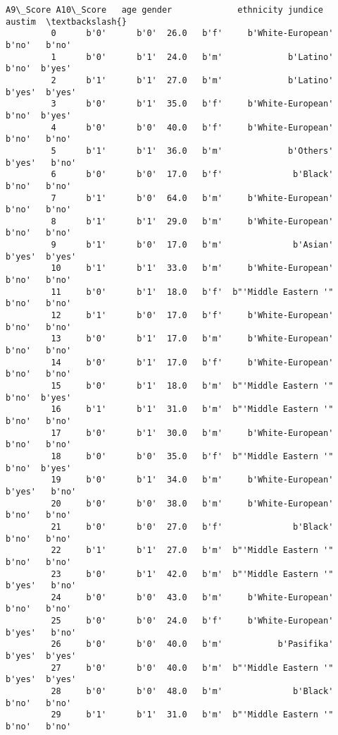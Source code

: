 \documentclass[11pt]{article}
\begin{document}
\begin{Verbatim}[commandchars=\\\{\}]
            A9\_Score A10\_Score   age gender             ethnicity jundice  austim  \textbackslash{}
         0      b'0'      b'0'  26.0   b'f'     b'White-European'   b'no'   b'no'   
         1      b'0'      b'1'  24.0   b'm'             b'Latino'   b'no'  b'yes'   
         2      b'1'      b'1'  27.0   b'm'             b'Latino'  b'yes'  b'yes'   
         3      b'0'      b'1'  35.0   b'f'     b'White-European'   b'no'  b'yes'   
         4      b'0'      b'0'  40.0   b'f'     b'White-European'   b'no'   b'no'   
         5      b'1'      b'1'  36.0   b'm'             b'Others'  b'yes'   b'no'   
         6      b'0'      b'0'  17.0   b'f'              b'Black'   b'no'   b'no'   
         7      b'1'      b'0'  64.0   b'm'     b'White-European'   b'no'   b'no'   
         8      b'1'      b'1'  29.0   b'm'     b'White-European'   b'no'   b'no'   
         9      b'1'      b'0'  17.0   b'm'              b'Asian'  b'yes'  b'yes'   
         10     b'1'      b'1'  33.0   b'm'     b'White-European'   b'no'   b'no'   
         11     b'0'      b'1'  18.0   b'f'  b"'Middle Eastern '"   b'no'   b'no'   
         12     b'1'      b'0'  17.0   b'f'     b'White-European'   b'no'   b'no'   
         13     b'0'      b'1'  17.0   b'm'     b'White-European'   b'no'   b'no'   
         14     b'0'      b'1'  17.0   b'f'     b'White-European'   b'no'   b'no'   
         15     b'0'      b'1'  18.0   b'm'  b"'Middle Eastern '"   b'no'  b'yes'   
         16     b'1'      b'1'  31.0   b'm'  b"'Middle Eastern '"   b'no'   b'no'   
         17     b'0'      b'1'  30.0   b'm'     b'White-European'   b'no'   b'no'   
         18     b'0'      b'0'  35.0   b'f'  b"'Middle Eastern '"   b'no'  b'yes'   
         19     b'0'      b'1'  34.0   b'm'     b'White-European'  b'yes'   b'no'   
         20     b'0'      b'0'  38.0   b'm'     b'White-European'   b'no'   b'no'   
         21     b'0'      b'0'  27.0   b'f'              b'Black'   b'no'   b'no'   
         22     b'1'      b'1'  27.0   b'm'  b"'Middle Eastern '"   b'no'   b'no'   
         23     b'0'      b'1'  42.0   b'm'  b"'Middle Eastern '"  b'yes'   b'no'   
         24     b'0'      b'0'  43.0   b'm'     b'White-European'   b'no'   b'no'   
         25     b'0'      b'0'  24.0   b'f'     b'White-European'  b'yes'   b'no'   
         26     b'0'      b'0'  40.0   b'm'           b'Pasifika'  b'yes'  b'yes'   
         27     b'0'      b'0'  40.0   b'm'  b"'Middle Eastern '"  b'yes'  b'yes'   
         28     b'0'      b'0'  48.0   b'm'              b'Black'   b'no'   b'no'   
         29     b'1'      b'1'  31.0   b'm'  b"'Middle Eastern '"   b'no'   b'no'   

\end{Verbatim}
\end{document}
